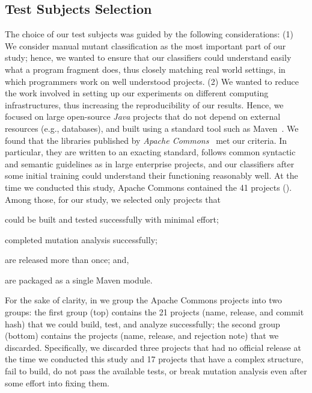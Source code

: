 \documentclass[sigconf,review,anonymous]{acmart}
\begin{document}
\subsection{Test Subjects Selection}
\label{sec:selection}
The choice of our test subjects was guided by the following considerations:
(1) We consider manual mutant classification as the most important part of our study;
hence, we wanted to ensure that our classifiers could understand easily what a program
fragment does, thus closely matching real world settings, in which programmers
work on well understood projects.
(2) We wanted to reduce the work involved in setting up our experiments
on different computing infrastructures, thus %
increasing the reproducibility of our results. 
Hence, we focused on large open-source \emph{Java} projects that do
not depend on
external resources (e.g., databases), and built using a standard tool such as Maven~\cite{maven}.
We found that the libraries published by \emph{Apache Commons}~\cite{commons} met our criteria.
In particular, they are written to an exacting standard, follows common syntactic
and semantic guidelines as in large enterprise projects, and our classifiers
after some initial training could understand their functioning %
reasonably well.
%
At the time we conducted this study,
Apache Commons contained the 41 projects
().
%
Among those, for our study, we selected only projects that
\begin{enumerate*}[label=(\arabic*)]
  \item could be built and tested successfully with minimal effort;
  \item completed mutation analysis successfully;
  \item are released more than once; and,
  \item are packaged as a single Maven module.
\end{enumerate*}

For the sake of clarity, in  we group the
Apache Commons projects into two groups:
the first group (top) contains the 21 projects (name, release, and commit hash)
that we could build, test, and analyze successfully;
the second group (bottom) contains the projects (name, release, and rejection note) that we discarded.
%
Specifically, we discarded three projects that had no official release at the time we conducted this study and 
17 projects that have a complex structure, fail to build, do not pass the available tests, or break mutation analysis even after some effort into fixing them.%
\end{document}
